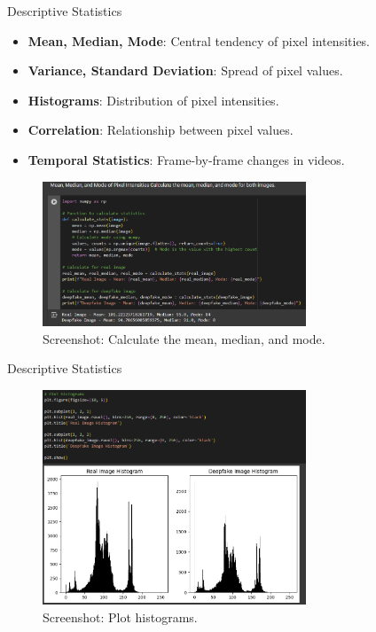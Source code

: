 \documentclass{beamer}
\begin{document}
\begin{frame}{Descriptive Statistics}
    \begin{itemize}
        \item \textbf{Mean, Median, Mode}: Central tendency of pixel intensities.
        \item \textbf{Variance, Standard Deviation}: Spread of pixel values.
        \item \textbf{Histograms}: Distribution of pixel intensities.
        \item \textbf{Correlation}: Relationship between pixel values.
        \item \textbf{Temporal Statistics}: Frame-by-frame changes in videos.
    \end{itemize}
    \begin{figure}
        \centering
        \includegraphics[width=0.7\textwidth]{mean.png} %
        \caption{Screenshot: Calculate the mean, median, and mode.}
    \end{figure}
\end{frame}

\begin{frame}{Descriptive Statistics}
    \begin{figure}
        \centering
        \includegraphics[width=0.7\textwidth]{histo.png} %
        \caption{Screenshot: Plot histograms.}
    \end{figure}
\end{frame}
\end{document}
